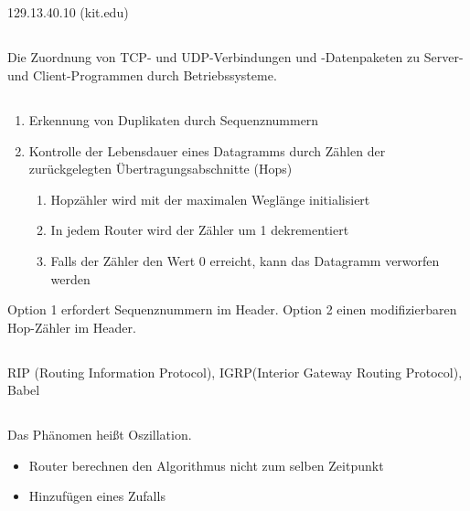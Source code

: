 \documentclass[a4paper]{article}
\begin{document}
\subsection{}
129.13.40.10 (kit.edu)
\subsection{}
Die Zuordnung von TCP- und UDP-Verbindungen und -Datenpaketen zu Server- und Client-Programmen durch Betriebssysteme.
\subsection{}
\begin{enumerate}
\item Erkennung von Duplikaten durch Sequenznummern
\item Kontrolle der Lebensdauer eines Datagramms durch Zählen der zurückgelegten Übertragungsabschnitte (Hops)
\begin{enumerate}
\item Hopzähler wird mit der maximalen Weglänge initialisiert
\item In jedem Router wird der Zähler um 1 dekrementiert
\item Falls der Zähler den Wert 0 erreicht, kann das Datagramm verworfen werden
\end{enumerate}
\end{enumerate}
Option 1 erfordert Sequenznummern im Header.
Option 2 einen modifizierbaren Hop-Zähler im Header.
\subsection{}
RIP (Routing Information Protocol), IGRP(Interior Gateway Routing Protocol), Babel
\subsection{}
Das Phänomen heißt Oszillation.
\begin{itemize}
\item Router berechnen den Algorithmus nicht zum selben Zeitpunkt
\item Hinzufügen eines Zufalls
\end{itemize}
\pagebreak
\section{}
\subsection{}
\end{document}
